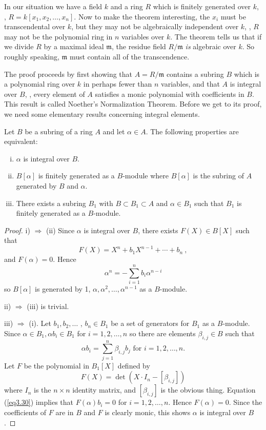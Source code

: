 In our situation we have a field $k$ and a ring $R$ which is finitely generated over $k$, \ie, $R=k[x_{1},x_{2},\ldots,x_{n}]$. Now to make the theorem interesting, the $x_{i}$ must be transcendental over $k$, but they may not be algebraically independent over $k$, \ie, $R$ may not be the polynomial ring in $n$ variables over $k$. The theorem tells us that if we divide $R$ by a maximal ideal $\mathfrak{m}$, the residue field $R/\mathfrak{m}$ {\it is} algebraic over $k$. So roughly speaking, $\mathfrak{m}$ must contain all of the transcendence.

The proof proceeds by first showing that $A=R/\mathfrak{m}$ contains a subring $B$ which is a polynomial ring over $k$ in perhaps fewer than $n$ variables, and that $A$ is integral over $B$, \ie, every element of $A$ satisfies a monic polynomial with coefficients in $B$. This result is called Noether's Normalization Theorem. Before we get to its proof, we need some elementary results concerning integral elements.

\begin{prop}
\label{p3.1.1}
Let $B$ be a subring of a ring $A$ and let $\alpha \in A$. The following properties are equivalent:
\begin{enumerate}[(i)]
\item
$\alpha$ is integral over $B$.
\item
$B[\alpha]$ is finitely generated as a $B$-module where $B[\alpha]$ is the subring of $A$
generated by $B$ and $\alpha$.
\item
There exists a subring $B_{1}$ with $B\subset B_{1} \subset A$ and $\alpha \in B_{1}$ such that $B_{1}$ is
finitely generated as a $B$-module.
\end{enumerate}
\end{prop}

\begin{proof} 
i) $\Rightarrow $ (ii) Since $\alpha$ is integral over $B$, there exists $F(X)\in B[X]$ such that
$$
F(X)=X^{n}+b_{1}X^{n-1}+\cdots+b_{n}\ ,
$$
and $F(\alpha)=0$. Hence
$$
\alpha^{n}=-\sum_{i=1}^{n}b_{i}\alpha^{n-i}
$$
so $B[\alpha]$ is generated by 1, $\alpha,\alpha^{2},\ldots,\alpha^{n-1}$ as a $B$-module.

ii) $\Rightarrow$ (iii) is trivial.

iii) $\Rightarrow$ (i). Let $b_{1}, b_{2}, \ldots$ , $b_{n}\in B_{1}$ be a set of generators for $B_{1}$ as a $B$-module. Since $\alpha \in B_{1},\alpha b_{i}\in B_{1}$ for $i=1,2,\ldots,n$ so there are elements $\beta_{i,j}\in B$ such that
\begin{equation}
\label{eq3.30}
\alpha b_{i}=\sum_{j=1}^{n}\beta_{i,j}b_{j}\text{ for }i=1,2,\ldots,n .
\end{equation}
Let $F$ be the polynomial in $B_1[X]$ defined by
$$
F(X)=\det(X\cdot I_{n}-[\beta_{i,j}])
$$
where $I_{n}$ is the $n\times n$ identity matrix, and $[\beta_{i,j}]$ is the obvious thing. Equation (\ref{eq3.30}) implies that $F(\alpha)b_{i}=0$ for $i=1,2,\ldots,n$. Hence $F(\alpha)=0$. Since the coefficients of $F$ are in $B$ and $F$ is clearly monic, this shows $\alpha$ is integral over $B$. 
\end{proof}

